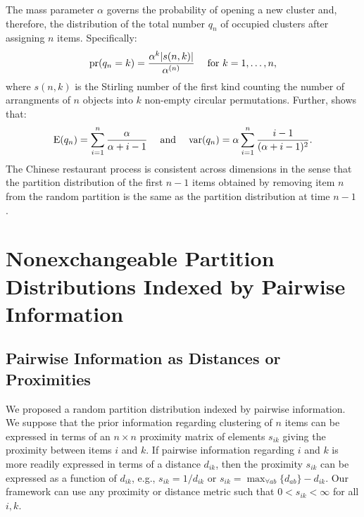\documentclass[lineno]{biometrika-dbd}
\newcommand{\mass}{\alpha}
\newcommand{\sizeof}[1]{| #1 |}
\begin{document}
The mass parameter $\mass$ governs the probability of opening a new cluster
and, therefore, the distribution of the total number $q_n$ of occupied clusters
after assigning $n$ items.  Specifically:
\begin{equation}
\label{eq_dist_number_of_clusters}
\text{pr}(q_n = k) = \frac{ \mass^k \sizeof{s(n,k)} }{ \mass^{(n)} } \hspace{3ex} \text{for} \ k=1,\ldots,n,
\end{equation}
where $s(n,k)$ is the Stirling number of the first kind counting the number of
arrangments of $n$ objects into $k$ non-empty circular permutations.  Further,
\citet{arra2003} shows that:
\begin{equation}
\label{eq_moments_number_of_clusters}
\text{E}(q_n) = \sum_{i=1}^n \frac{\mass}{\mass+i-1} \hspace{3ex} \text{and} \hspace{3ex}
\text{var}(q_n) = \mass \sum_{i=1}^n \frac{i-1}{(\mass+i-1)^2}.
\end{equation}
The Chinese restaurant process is consistent across dimensions in the sense
that the partition distribution of the first $n-1$ items obtained by removing
item $n$ from the random partition is the same as the partition distribution at
time $n-1$ \citep[page 92]{aldo:1985}.

\section{Nonexchangeable Partition Distributions Indexed by Pairwise Information}
\label{sec_proposal}

\subsection{Pairwise Information as Distances or Proximities}
\label{sec_proposal_proximities}

We proposed a random partition distribution indexed by pairwise information.
We suppose that the prior information regarding clustering of $n$ items can be
expressed in terms of an $n \times n$ proximity matrix of elements $s_{ik}$
giving the proximity between items $i$ and $k$.  If pairwise information
regarding $i$ and $k$ is more readily expressed in terms of a distance
$d_{ik}$, then the proximity $s_{ik}$ can be expressed as a function of
$d_{ik}$, e.g., $s_{ik} = 1/d_{ik}$ or $s_{ik} = \max_{\forall ab}\{d_{ab}\} -
d_{ik}$.  Our framework can use any proximity or distance metric such that $0 <
s_{ik} < \infty$ for all $i,k$.
\end{document}
